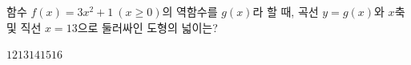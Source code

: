 함수 $f(x)=3x^2+1\ (x\ge 0)$의 역함수를 $g(x)$라 할 때, 곡선 $y=g(x)$와 $x$축 및 직선 $x=13$으로 둘러싸인 도형의 넓이는?
\begin{choices32}{$12$}{$13$}{$14$}{$15$}{$16$}\end{choices32}
